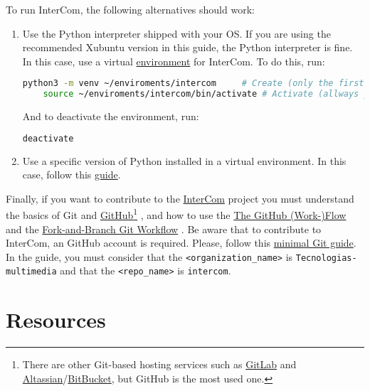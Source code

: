 To run InterCom, the following alternatives should work:
\begin{enumerate}
\item Use the Python interpreter shipped with your OS. If you are
  using the recommended Xubuntu version in this guide, the Python
  interpreter is fine. In this case, use a virtual
  \href{https://docs.python.org/3/library/venv.html}{environment} for
  InterCom. To do this, run:
  \begin{lstlisting}[language=Bash]
    python3 -m venv ~/enviroments/intercom     # Create (only the first time)
    source ~/enviroments/intercom/bin/activate # Activate (allways you run InterCom)
  \end{lstlisting}
  And to deactivate the environment, run:
  \begin{lstlisting}[language=Bash]
    deactivate
  \end{lstlisting}
  
\item Use a specific version of Python installed in a virtual environment. In this case, follow this 
\href{https://vicente-gonzalez-ruiz.github.io/Python_install/}{guide}.

\end{enumerate}

Finally, if you want to contribute to the
\href{https://github.com/Tecnologias-multimedia/intercom}{InterCom}
project \cite{intercom} you must understand the basics of Git
\cite{Git-book} and \href{https://github.com/}{GitHub}\footnote{There
are other Git-based hosting services such as
\href{https://about.gitlab.com/}{GitLab} and
\href{https://www.atlassian.com/git}{Altassian}/\href{https://bitbucket.org/product}{BitBucket},
but GitHub is the most used one.} \cite{GitHub}, and how to use the
\href{https://guides.github.com/introduction/flow/index.html}{The
  GitHub (Work-)Flow} and the
\href{https://github.com/vicente-gonzalez-ruiz/fork_and_branch_git_workflow}{Fork-and-Branch
  Git Workflow} \cite{fork-and-branch-git-workflow}. Be aware that to
contribute to InterCom, an GitHub account is required. Please, follow
this
\href{https://vicente-gonzalez-ruiz.github.io/using_GitHub/}{minimal
  Git guide}. In the guide, you must consider that the
\texttt{<organization\_name>} is \texttt{Tecnologias-multimedia} and
that the \texttt{<repo\_name>} is \texttt{intercom}.

\section{Resources}


